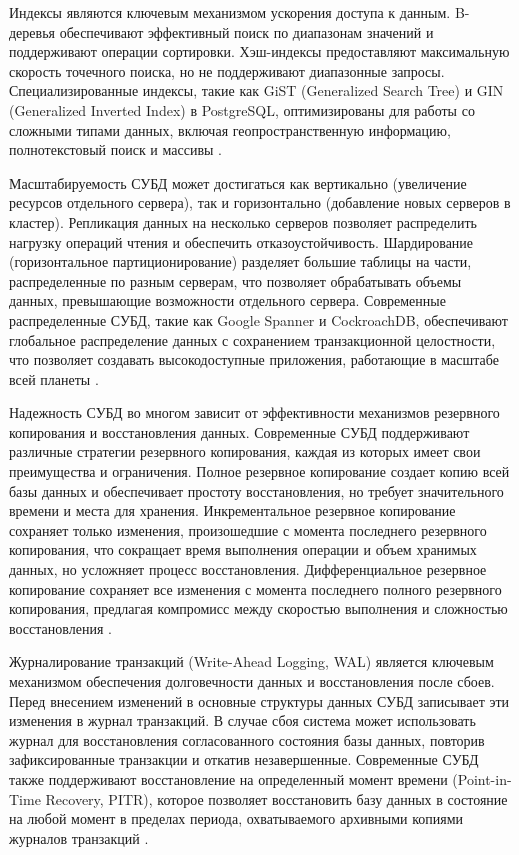 \documentclass{SibFU-docs}
\begin{document}
Индексы являются ключевым механизмом ускорения доступа к данным. B-деревья обеспечивают эффективный поиск по диапазонам значений и поддерживают операции сортировки. Хэш-индексы предоставляют максимальную скорость точечного поиска, но не поддерживают диапазонные запросы. Специализированные индексы, такие как GiST (Generalized Search Tree) и GIN (Generalized Inverted Index) в PostgreSQL, оптимизированы для работы со сложными типами данных, включая геопространственную информацию, полнотекстовый поиск и массивы \cite{elmasri2016}.

Масштабируемость СУБД может достигаться как вертикально (увеличение ресурсов отдельного сервера), так и горизонтально (добавление новых серверов в кластер). Репликация данных на несколько серверов позволяет распределить нагрузку операций чтения и обеспечить отказоустойчивость. Шардирование (горизонтальное партиционирование) разделяет большие таблицы на части, распределенные по разным серверам, что позволяет обрабатывать объемы данных, превышающие возможности отдельного сервера. Современные распределенные СУБД, такие как Google Spanner и CockroachDB, обеспечивают глобальное распределение данных с сохранением транзакционной целостности, что позволяет создавать высокодоступные приложения, работающие в масштабе всей планеты \cite{corbett2012}.


Надежность СУБД во многом зависит от эффективности механизмов резервного копирования и восстановления данных. Современные СУБД поддерживают различные стратегии резервного копирования, каждая из которых имеет свои преимущества и ограничения. Полное резервное копирование создает копию всей базы данных и обеспечивает простоту восстановления, но требует значительного времени и места для хранения. Инкрементальное резервное копирование сохраняет только изменения, произошедшие с момента последнего резервного копирования, что сокращает время выполнения операции и объем хранимых данных, но усложняет процесс восстановления. Дифференциальное резервное копирование сохраняет все изменения с момента последнего полного резервного копирования, предлагая компромисс между скоростью выполнения и сложностью восстановления \cite{gray1993}.

Журналирование транзакций (Write-Ahead Logging, WAL) является ключевым механизмом обеспечения долговечности данных и восстановления после сбоев. Перед внесением изменений в основные структуры данных СУБД записывает эти изменения в журнал транзакций. В случае сбоя система может использовать журнал для восстановления согласованного состояния базы данных, повторив зафиксированные транзакции и откатив незавершенные. Современные СУБД также поддерживают восстановление на определенный момент времени (Point-in-Time Recovery, PITR), которое позволяет восстановить базу данных в состояние на любой момент в пределах периода, охватываемого архивными копиями журналов транзакций \cite{gray1993}.
\end{document}
